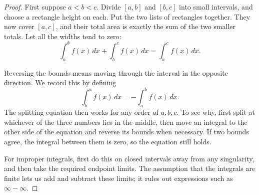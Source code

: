 
\begin{proof}
First suppose $a<b<c$. Divide $[a,b]$ and $[b,c]$ into small intervals,
and choose a rectangle height on each. Put the two lists of rectangles
together. They now cover $[a,c]$, and their total area is exactly the sum
of the two smaller totals. Let all the widths tend to zero:
$$\int_a^b f(x)\,dx+\int_b^c f(x)\,dx=\int_a^c f(x)\,dx.$$

Reversing the bounds means moving through the interval in the opposite
direction. We record this by defining
$$\int_b^a f(x)\,dx=-\int_a^b f(x)\,dx.$$
The splitting equation then works for any order of $a,b,c$. To see why,
first split at whichever of the three numbers lies in the middle, then
move an integral to the other side of the equation and reverse its
bounds when necessary. If two bounds agree, the integral between them
is zero, so the equation still holds.

For improper integrals, first do this on closed intervals away from any
singularity, and then take the required endpoint limits. The assumption
that the integrals are finite lets us add and subtract these limits;
it rules out expressions such as $\infty-\infty$.
\end{proof}



